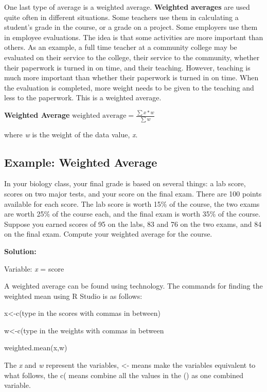 \documentclass[]{book}
\begin{document}
One last type of average is a weighted average. \textbf{Weighted averages} are used quite often in different situations. Some teachers use them in calculating a student's grade in the course, or a grade on a project. Some employers use them in employee evaluations. The idea is that some activities are more
important than others. As an example, a full time teacher at a community college may be evaluated on their service to the college, their service to the community, whether their paperwork is turned in on time, and their teaching. However, teaching is much more important than whether their paperwork is turned in on time. When the evaluation is completed, more weight needs to be given to the teaching and less to the paperwork. This is a weighted average.

\textbf{Weighted Average}
\(\text{weighted average}=\frac{\sum{x*w}}{\sum{w}}\)

where \emph{w} is the weight of the data value, \emph{x}.

\hypertarget{example-weighted-average}{%
\subsection{Example: Weighted Average}\label{example-weighted-average}}

In your biology class, your final grade is based on several things: a lab score, scores on two major tests, and your score on the final exam. There are 100 points available for each score. The lab score is worth 15\% of the course, the two exams are worth 25\% of the course each, and the final exam is worth 35\% of the course. Suppose you earned scores of 95 on the labs, 83 and 76 on the two exams, and 84 on the final exam. Compute your weighted average for the course.

\textbf{Solution:}

Variable: \emph{x} = score

A weighted average can be found using technology.
The commands for finding the weighted mean using R Studio is as follows:

x\textless{}-c(type in the scores with commas in between)

w\textless{}-c(type in the weights with commas in between

weighted.mean(x,w)

The \emph{x} and \emph{w} represent the variables, \textless{}- means make the variables equivalent to what follows, the c( means combine all the values in the () as one combined variable.
\end{document}
